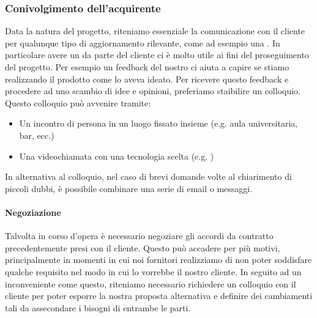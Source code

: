 		\subsubsection{Conivolgimento dell'acquirente} \label{ConivolgimentoAcquirente}
		Data la natura del progetto, riteniamo essenziale la comunicazione con il cliente per qualunque tipo di aggiornamento rilevante, come ad esempio una .
		In particolare avere un  da parte del cliente ci è molto utile ai fini del proseguimento del progetto.
		Per esempio un feedback del nostro  ci aiuta a capire se stiamo realizzando il prodotto come \II lo aveva ideato.
		Per ricevere questo feedback e procedere ad uno scambio di idee e opinioni, preferiamo staibilire un colloquio.
		Questo colloquio può avvenire tramite:
		\begin{itemize}
			\item Un incontro di persona in un luogo fissato insieme (e.g. aula universitaria, bar, ecc.)
			\item Una videochiamata con una tecnologia scelta (e.g. )
		\end{itemize}
		In alternativa al colloquio, nel caso di brevi domande volte al chiarimento di piccoli dubbi, è possibile combinare una serie di email o messaggi.

		\paragraph{Negoziazione} \label{Negoziazione}
		Talvolta in corso d'opera è necessario negoziare gli accordi da contratto precedentemente presi con il cliente.
		Questo può accadere per più motivi, principalmente in momenti in cui noi fornitori realizziamo di non poter soddisfare qualche requisito nel modo in cui lo vorrebbe il nostro cliente.
		In seguito ad un inconveniente come questo, riteniamo necessario richiedere un colloquio con il cliente per poter esporre la nostra proposta alternativa e definire dei cambiamenti tali da assecondare i bisogni di entrambe le parti.

